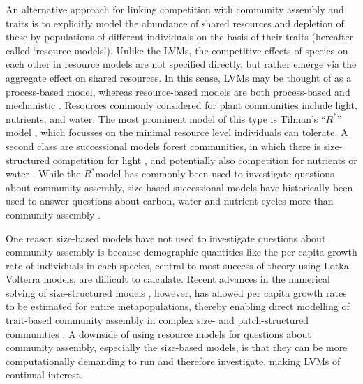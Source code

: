 \documentclass[a4paper,11pt]{article}
\newcommand{\Rstar}{\ensuremath{R^*}}
\begin{document}
An alternative approach for linking competition with community assembly and traits is to explicitly model the abundance of shared resources and depletion of these by populations of different individuals on the basis of their traits (hereafter called `resource models'). Unlike the LVMs, the competitive effects of species on each other in resource models are not specified directly, but rather emerge via the aggregate effect on shared resources. In this sense, LVMs may be thought of as a process-based model, whereas resource-based models are both process-based and mechanistic \citep{Connolly-2017}. Resources commonly considered for plant communities include light, nutrients, and water. The most prominent model of this type is Tilman's ``\Rstar'' model \citep{Tilman-1977, Tilman-1982}, which focusses on the minimal resource level individuals can tolerate. A second class are successional models forest communities, in which there is size-structured competition for light \citep{Huston-1987,Kohyama-1993,Moorcroft-2001,Falster-2011,Falster-2016,Weng-2019}, and potentially also competition for nutrients or water \citep{Moorcroft-2001,Farrior-2013, Smith-2014, Fisher-2018,Weng-2019}. While the \Rstar model has commonly been used to investigate questions about community assembly, size-based successional models have historically been used to answer questions about carbon, water and nutrient cycles more than community assembly \citep{Moorcroft-2001,Medvigy-2012,Smith-2014,Fisher-2018}. 

One reason size-based models have not used to investigate questions about community assembly is because demographic quantities like the per capita growth rate of individuals in each species, central to most success of theory using Lotka-Volterra models, are difficult to calculate. Recent advances in the numerical solving of size-structured models \citep{Falster-2016}, however, has allowed per capita growth rates to be estimated for entire metapopulations, thereby enabling direct modelling of trait-based community assembly in complex size- and patch-structured communities \cite{Falster-2017}. A downside of using resource models for questions about community assembly, especially the size-based models, is that they can be more computationally demanding to run and therefore investigate, making LVMs of continual interest.
\end{document}
